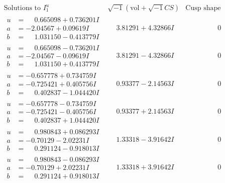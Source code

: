 \documentclass[1p]{elsarticle_modified}
\theoremstyle{definition}
\newcommand{\I}{\sqrt{-1}}
\begin{document}
$$\begin{array}{c|c|c}  
\text{Solutions to }I^u_{1}& \I (\text{vol} + \sqrt{-1}CS) & \text{Cusp shape}\\
 \hline 
\begin{aligned}
u &= \phantom{-}0.665098 + 0.736201 I \\
a &= -2.04567 + 0.09619 I \\
b &= \phantom{-}1.031150 - 0.413779 I\end{aligned}
 & \phantom{-}3.81291 + 4.32866 I & \phantom{-0.000000 } 0 \\ \hline\begin{aligned}
u &= \phantom{-}0.665098 - 0.736201 I \\
a &= -2.04567 - 0.09619 I \\
b &= \phantom{-}1.031150 + 0.413779 I\end{aligned}
 & \phantom{-}3.81291 - 4.32866 I & \phantom{-0.000000 } 0 \\ \hline\begin{aligned}
u &= -0.657778 + 0.734759 I \\
a &= -0.725421 + 0.405756 I \\
b &= \phantom{-}0.402837 - 1.044420 I\end{aligned}
 & \phantom{-}0.93377 - 2.14563 I & \phantom{-0.000000 } 0 \\ \hline\begin{aligned}
u &= -0.657778 - 0.734759 I \\
a &= -0.725421 - 0.405756 I \\
b &= \phantom{-}0.402837 + 1.044420 I\end{aligned}
 & \phantom{-}0.93377 + 2.14563 I & \phantom{-0.000000 } 0 \\ \hline\begin{aligned}
u &= \phantom{-}0.980843 + 0.086293 I \\
a &= -0.70129 - 2.02231 I \\
b &= \phantom{-}0.291124 - 0.918013 I\end{aligned}
 & \phantom{-}1.33318 - 3.91642 I & \phantom{-0.000000 } 0 \\ \hline\begin{aligned}
u &= \phantom{-}0.980843 - 0.086293 I \\
a &= -0.70129 + 2.02231 I \\
b &= \phantom{-}0.291124 + 0.918013 I\end{aligned}
 & \phantom{-}1.33318 + 3.91642 I & \phantom{-0.000000 } 0 \\ \hline\begin{aligned}

\end{aligned}
\end{array}$$
\end{document}

